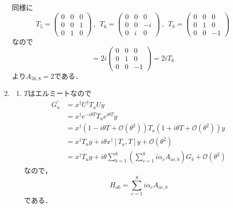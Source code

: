 \documentclass[a4paper,pdflatex,ja=standard]{bxjsarticle}
\begin{document}
\begin{enumerate}
  同様に
  \begin{equation}
    T_{5}
    =
    \begin{pmatrix}
      0 & 0 & 0 \\
      0 & 0 & 1 \\
      0 & 1 & 0
    \end{pmatrix}
    \ ,\ \ 
    T_{6}
    =
    \begin{pmatrix}
      0 & 0 & 0 \\
      0 & 0 & -i \\
      0 & i & 0
    \end{pmatrix}
    \ ,\ \ 
    T_{8}
    =
    \begin{pmatrix}
      0 & 0 & 0 \\
      0 & 1 & 0 \\
      0 & 0 & -1
    \end{pmatrix}
  \end{equation}
  なので
  \begin{equation}
    [T_{5},T_{6}]
    =
    2i
    \begin{pmatrix}
      0 & 0 & 0 \\
      0 & 1 & 0 \\
      0 & 0 & -1
    \end{pmatrix}
    =
    2iT_{8}
  \end{equation}
  より$A_{56,8}=2$である．

  \item 

  \begin{enumerate}
    \item 

    $T$はエルミートなので
    \begin{align}
      G_{a}^{\prime}
      &=
      x^{\dagger}U^{\dagger}T_{a}Uy
      \nonumber
      \\
      &=
      x^{\dagger}e^{-i\theta T}T_{a}e^{i\theta T}y
      \nonumber
      \\
      &=
      x^{\dagger}
      \left( 1 - i\theta T +\mathcal{O}(\theta^2) \right)
      T_{a}
      \left( 1 + i\theta T +\mathcal{O}(\theta^2) \right)
      y
      \nonumber
      \\
      &=
      x^{\dagger}T_{a}y
      +
      i\theta x^{\dagger}[T_{a},T]y
      +
      \mathcal{O}(\theta^2)
      \nonumber
      \\
      &=
      x^{\dagger}T_{a}y
      +
      i\theta\sum_{b=1}^{8}
      \left(  
        \sum_{c=1}^{8}i\alpha_{c}A_{ac,b}
      \right)
      G_{b}
      +
      \mathcal{O}(\theta^2)
    \end{align}
    なので，
    \begin{equation}
      H_{ab}
      =
      \sum_{c=1}^{8}i\alpha_{c}A_{ac,b}
    \end{equation}
    である．


\end{enumerate}
\end{enumerate}
\end{document}
